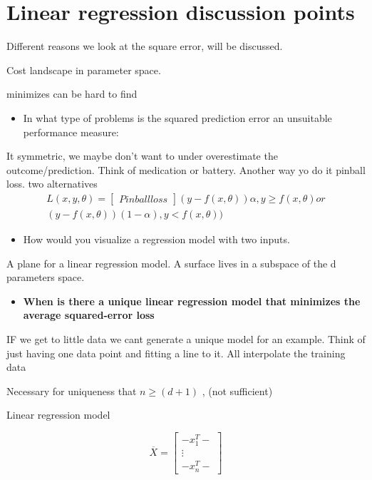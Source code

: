 \section{Linear regression discussion points}
Different reasons we look at the square error, will be discussed. 

Cost landscape in parameter space. 

minimizes can be hard to find 

\begin{itemize}
	\item In what type of problems is the squared prediction error an unsuitable performance measure:
\end{itemize}

It symmetric, we maybe don't want to under overestimate the outcome/prediction. Think of medication or battery. Another way yo do it 
pinball loss. two alternatives 
\begin{equation}
\begin{aligned}
L(x,y,\theta ) = \begin{bmatrix} Pinball loss \end{bmatrix} (y-f(x,\theta)) \alpha , y \ge f(x, \theta) or \\
(y-f(x,\theta))(1-\alpha), y < f(x, \theta))
\end{aligned}
\end{equation}

\begin{itemize}
	\item How would you visualize a regression model with two inputs.
\end{itemize}

A plane for a linear regression model. A surface lives in a subspace of the d parameters space. 

\begin{itemize}
	\item \textbf{When is there a unique linear regression model that minimizes the average squared-error loss} 
\end{itemize}

IF we get to little data we cant generate a unique model for an example. Think of just having one data point and fitting a line to it. 
All interpolate the training data 

Necessary for uniqueness that $n \ge (d+1)$ , (not sufficient)

Linear regression model

\begin{equation}
\overline{X} = \begin{bmatrix} -x_1^{T}- \\ \vdots \\ -x_n^{T}- \end{bmatrix}
\end{equation}

